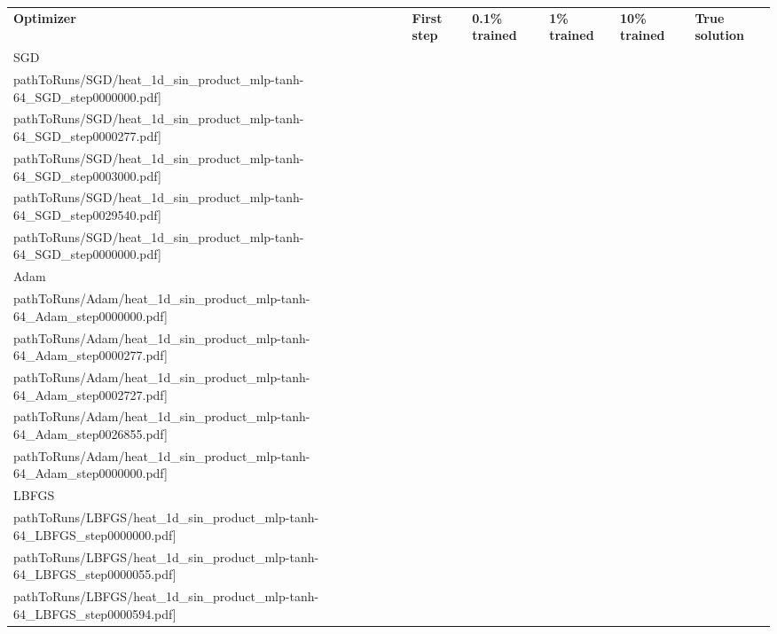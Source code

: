 \begin{table}[!h]
  \begin{small}
    \centering
    \def\pathToRuns{kfac_pinns_exp/exp42_visualize_solutions/visualize_solution}
    \renewcommand\tabularxcolumn[1]{>{\Centering}m{#1}}
    \begin{tabularx}{\textwidth}{XXXXXX}
      \textbf{Optimizer} & \textbf{First step} & \textbf{0.1\% trained} & \textbf{1\% trained} & \textbf{10\% trained} & \textbf{True solution}
      \\
      SGD
      &\texttt{[image: \\pathToRuns/SGD/heat\_1d\_sin\_product\_mlp-tanh-64\_SGD\_step0000000.pdf]}
      &\texttt{[image: \\pathToRuns/SGD/heat\_1d\_sin\_product\_mlp-tanh-64\_SGD\_step0000277.pdf]}
      &\texttt{[image: \\pathToRuns/SGD/heat\_1d\_sin\_product\_mlp-tanh-64\_SGD\_step0003000.pdf]}
      &\texttt{[image: \\pathToRuns/SGD/heat\_1d\_sin\_product\_mlp-tanh-64\_SGD\_step0029540.pdf]}
      &\texttt{[image: \\pathToRuns/SGD/heat\_1d\_sin\_product\_mlp-tanh-64\_SGD\_step0000000.pdf]}
      \\
      Adam
      &\texttt{[image: \\pathToRuns/Adam/heat\_1d\_sin\_product\_mlp-tanh-64\_Adam\_step0000000.pdf]}
      &\texttt{[image: \\pathToRuns/Adam/heat\_1d\_sin\_product\_mlp-tanh-64\_Adam\_step0000277.pdf]}
      &\texttt{[image: \\pathToRuns/Adam/heat\_1d\_sin\_product\_mlp-tanh-64\_Adam\_step0002727.pdf]}
      &\texttt{[image: \\pathToRuns/Adam/heat\_1d\_sin\_product\_mlp-tanh-64\_Adam\_step0026855.pdf]}
      &\texttt{[image: \\pathToRuns/Adam/heat\_1d\_sin\_product\_mlp-tanh-64\_Adam\_step0000000.pdf]}
      \\
      LBFGS
      &\texttt{[image: \\pathToRuns/LBFGS/heat\_1d\_sin\_product\_mlp-tanh-64\_LBFGS\_step0000000.pdf]}
      &\texttt{[image: \\pathToRuns/LBFGS/heat\_1d\_sin\_product\_mlp-tanh-64\_LBFGS\_step0000055.pdf]}
      &\texttt{[image: \\pathToRuns/LBFGS/heat\_1d\_sin\_product\_mlp-tanh-64\_LBFGS\_step0000594.pdf]}

\end{tabularx}
\end{small}
\end{table}
